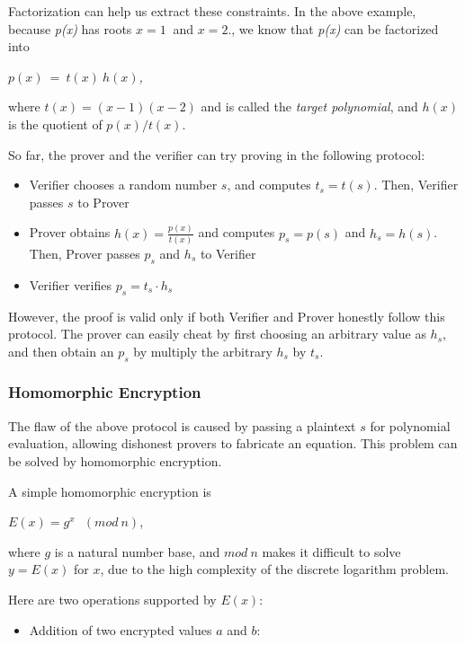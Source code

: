 \documentclass[
]{report}
\providecommand{\tightlist}{%
  \setlength{\itemsep}{0pt}\setlength{\parskip}{0pt}}
\begin{document}
Factorization can help us extract these constraints. In the above
example, because \emph{p(x)} has roots \(x = 1\ \) and \(x = 2\)., we
know that \emph{p(x)} can be factorized into

\(p(x)\  = \ t(x)\ h(x)\)\emph{,}

where \(t(x) = (x - 1)(x - 2)\) and is called the \emph{target
polynomial}, and \(h(x)\) is the quotient of \(p(x)\text{/}t(x)\).

So far, the prover and the verifier can try proving in the following
protocol:

\begin{itemize}
\item
  Verifier chooses a random number \(s\), and computes \(t_{s} = t(s)\).
  Then, Verifier passes \(s\) to Prover
\item
  Prover obtains \(h(x) = \frac{p(x)}{t(x)}\) and computes
  \(p_{s} = p(s)\) and \(h_{s} = h(s)\). Then, Prover passes \(p_{s}\)
  and \(h_{s}\) to Verifier
\item
  Verifier verifies \(p_{s} = t_{s} \cdot h_{s}\)
\end{itemize}

However, the proof is valid only if both Verifier and Prover honestly
follow this protocol. The prover can easily cheat by first choosing an
arbitrary value as \(h_{s}\), and then obtain an \(p_{s}\) by multiply
the arbitrary \(h_{s}\) by \(t_{s}\).

\subsubsection{Homomorphic Encryption}

The flaw of the above protocol is caused by passing a plaintext \(s\)
for polynomial evaluation, allowing dishonest provers to fabricate an
equation. This problem can be solved by homomorphic encryption.

A simple homomorphic encryption is

\(E(x) = g^{x}\ \ \ (mod\ n)\),

where \(g\) is a natural number base, and \(mod\ n\) makes it difficult
to solve \(y = E(x)\) for \(x\), due to the high complexity of the
discrete logarithm problem.

Here are two operations supported by \(E(x)\):

\begin{itemize}
\tightlist
\item
  Addition of two encrypted values \(a\) and \(b\):
\end{itemize}
\end{document}
